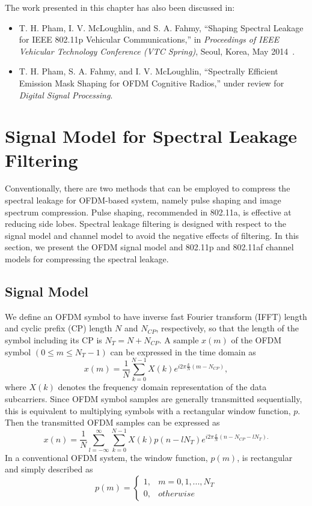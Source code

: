 The work presented in this chapter has also been discussed in:
\begin{itemize}
\item  T. H. Pham, I. V. McLoughlin, and S. A. Fahmy, ``Shaping Spectral Leakage for IEEE 802.11p Vehicular Communications,'' in \textit{Proceedings of IEEE Vehicular Technology Conference (VTC Spring)}, Seoul, Korea, May 2014~\cite{PhamMay2014}.
\item T. H. Pham, S. A. Fahmy, and I. V. McLoughlin, ``Spectrally Efficient Emission Mask Shaping for OFDM Cognitive Radios,''  under review for \textit{Digital Signal Processing}.
\end{itemize}

\section{Signal Model for Spectral Leakage Filtering}
\label{sec:SigMod}
Conventionally, there are two methods that can be employed to compress the spectral leakage for OFDM-based system, namely pulse shaping and image spectrum compression. Pulse shaping, recommended in 802.11a, is effective at reducing side lobes. Spectral leakage filtering is designed with respect to the signal model and channel model to avoid the negative effects of filtering. In this section, we present the OFDM signal model and 802.11p and 802.11af channel models for compressing the spectral leakage.

\subsection{Signal Model}
We define an OFDM symbol to have inverse fast Fourier transform (IFFT) length and cyclic prefix (CP) length $N$ and $N_{CP}$, respectively, so that the length of the symbol including its CP is $N_{T} = N + N_{CP}$.
A sample $x(m)$ of the OFDM symbol $(0\leq m \leq N_{T}-1)$ can be expressed in the time domain as
\begin{equation}
\label{xm}
x(m) = \frac{1}{N}\sum_{k=0}^{N-1} X(k) e^{i2\pi\frac{k}{N}(m-N_{CP})},
\end{equation}
where $X(k)$ denotes the frequency domain representation of the data subcarriers.
Since OFDM symbol samples are generally transmitted sequentially, this is equivalent to multiplying symbols with a rectangular window function, $p$.
Then the transmitted OFDM samples can be expressed as
\begin{equation}
\label{xn2}
x(n) = \frac{1}{N}\sum_{l=-\infty}^{\infty} \sum_{k=0}^{N-1} X(k) p(n-l N_{T}) e^{i2\pi\frac{k}{N}(n-N_{CP}-l N_{T}).}
\end{equation}
In a conventional OFDM system, the window function, $p(m)$, is rectangular and simply described as
\begin{equation}
\label{pm}
 p(m) =\begin{cases}1, & m = 0,1, ..., N_{T} \\  0, & otherwise \end{cases}
\end{equation}

